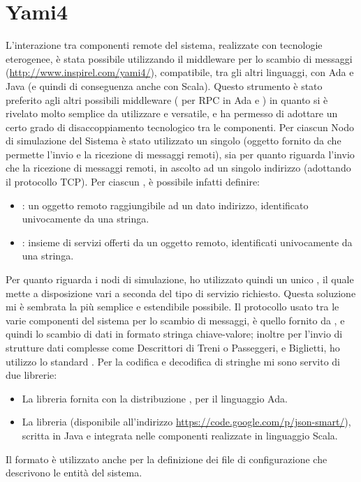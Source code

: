 	\section{Yami4}
L'interazione tra componenti remote del sistema, realizzate con tecnologie eterogenee, è stata possibile utilizzando il middleware per lo scambio di messaggi  (\url{http://www.inspirel.com/yami4/}), compatibile, tra gli altri linguaggi, con Ada e Java (e quindi di conseguenza anche con Scala). Questo strumento è stato preferito agli altri possibili middleware ( per RPC in Ada e ) in quanto si è rivelato molto semplice da utilizzare e versatile, e ha permesso di adottare un certo grado di disaccoppiamento tecnologico tra le componenti. Per ciascun Nodo di simulazione del Sistema è stato utilizzato un singolo  (oggetto fornito da  che permette l'invio e la ricezione di messaggi remoti), sia per quanto riguarda l'invio che la ricezione di messaggi remoti, in ascolto ad un singolo indirizzo (adottando il protocollo TCP). Per ciascun , è possibile infatti definire:
	\begin{itemize}
		\item {}: un oggetto remoto raggiungibile ad un dato indirizzo, identificato univocamente da una stringa.
		\item {}: insieme di servizi offerti da un oggetto remoto, identificati univocamente da una stringa.
	\end{itemize}
Per quanto riguarda i nodi di simulazione, ho utilizzato quindi un unico , il quale mette a disposizione vari  a seconda del tipo di servizio richiesto. Questa soluzione mi è sembrata la più semplice e estendibile possibile.
Il protocollo usato tra le varie componenti del sistema per lo scambio di messaggi, è quello fornito da , e quindi lo scambio di dati in formato stringa chiave-valore; inoltre per l'invio di strutture dati complesse come Descrittori di Treni o Passeggeri, e Biglietti, ho utilizzo lo standard . Per la codifica e decodifica di stringhe  mi sono servito di due librerie:
	\begin{itemize}
		\item La libreria  fornita con la distribuzione , per il linguaggio Ada.
		\item La libreria  (disponibile all'indirizzo \url{https://code.google.com/p/json-smart/}), scritta in Java e integrata nelle componenti realizzate in linguaggio Scala.
		
	\end{itemize}
	Il formato  è utilizzato anche per la definizione dei file di configurazione che descrivono le entità del sistema.



